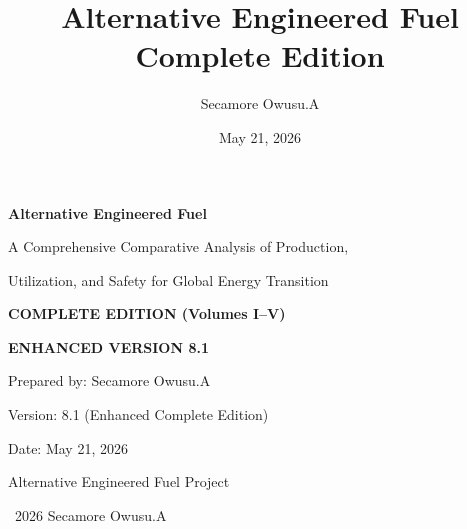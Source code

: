 \documentclass[12pt,twoside,openany]{book}
\title{Alternative Engineered Fuel\\Complete Edition}
\author{Secamore Owusu.A}
\date{May 21, 2026}
\begin{document}
\hypersetup{pageanchor=false}


\begin{titlepage}
    \centering
    \vspace*{1.5cm}
    {\Huge\bfseries Alternative Engineered Fuel\par}
    \vspace{0.5cm}
    {\Large A Comprehensive Comparative Analysis of Production,\par}
    {\Large Utilization, and Safety for Global Energy Transition\par}
    \vspace{1cm}
    {\Large \textbf{COMPLETE EDITION (Volumes I--V)}\par}
    \vspace{0.5cm}
    {\Large \textbf{ENHANCED VERSION 8.1}\par}
    \vspace{1.5cm}
    {\large Prepared by: Secamore Owusu.A\par}
    {\large Version: 8.1 (Enhanced Complete Edition)\par}
    {\large Date: May 21, 2026\par}
    \vspace{1.5cm}
    \vfill
    {\large Alternative Engineered Fuel Project\par}
    {\large \textcopyright\ 2026 Secamore Owusu.A\par}
\end{titlepage}

\end{document}
